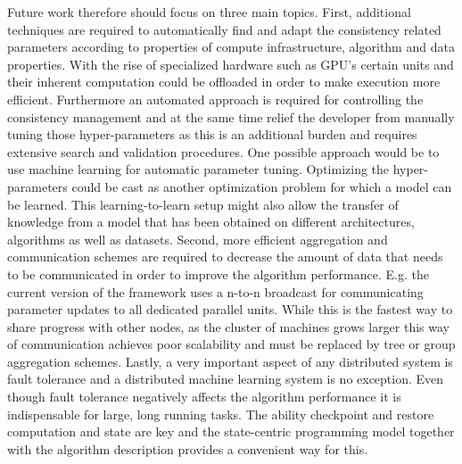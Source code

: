 Future work therefore should focus on three main topics.
First, additional techniques are required to automatically find and adapt the consistency related parameters according to properties of compute infrastructure, algorithm and data properties.
With the rise of specialized hardware such as GPU's certain units and their inherent computation could be offloaded in order to make execution more efficient.
Furthermore an automated approach is required for controlling the consistency management and at the same time relief the developer from manually tuning those hyper-parameters as this is an additional burden and requires extensive search and validation procedures.
One possible approach would be to use machine learning for automatic parameter tuning.
Optimizing the hyper-parameters could be cast as another optimization problem for which a model can be learned.
This learning-to-learn setup might also allow the transfer of knowledge from a model that has been obtained on different architectures, algorithms as well as datasets.
Second, more efficient aggregation and communication schemes are required to decrease the amount of data that needs to be communicated in order to improve the algorithm performance.
E.g. the current version of the framework uses a n-to-n broadcast for communicating parameter updates to all dedicated parallel units.
While this is the fastest way to share progress with other nodes, as the cluster of machines grows larger this way of communication achieves poor scalability and must be replaced by tree or group aggregation schemes.
Lastly, a very important aspect of any distributed system is fault tolerance and a distributed machine learning system is no exception.
Even though fault tolerance negatively affects the algorithm performance it is indispensable for large, long running tasks.
The ability checkpoint and restore computation and state are key and the state-centric programming model together with the algorithm description provides a convenient way for this.